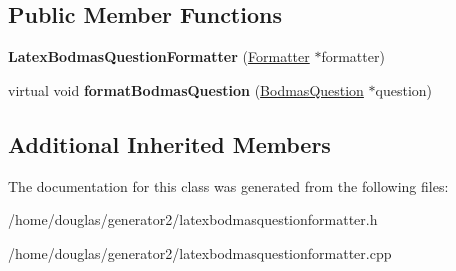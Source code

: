 \subsection*{Public Member Functions}
\begin{DoxyCompactItemize}
\item 
{\bfseries Latex\+Bodmas\+Question\+Formatter} (\hyperlink{classFormatter}{Formatter} $\ast$formatter)\hypertarget{classLatexBodmasQuestionFormatter_add7c9fceefb8c9e4aaf48c814199e3b8}{}\label{classLatexBodmasQuestionFormatter_add7c9fceefb8c9e4aaf48c814199e3b8}

\item 
virtual void {\bfseries format\+Bodmas\+Question} (\hyperlink{classBodmasQuestion}{Bodmas\+Question} $\ast$question)\hypertarget{classLatexBodmasQuestionFormatter_a0728ef69d83fa548ed4f3084bb1c5897}{}\label{classLatexBodmasQuestionFormatter_a0728ef69d83fa548ed4f3084bb1c5897}

\end{DoxyCompactItemize}
\subsection*{Additional Inherited Members}


The documentation for this class was generated from the following files\+:\begin{DoxyCompactItemize}
\item 
/home/douglas/generator2/latexbodmasquestionformatter.\+h\item 
/home/douglas/generator2/latexbodmasquestionformatter.\+cpp\end{DoxyCompactItemize}
